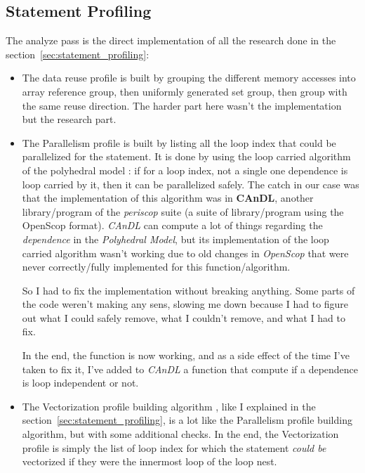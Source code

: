 \documentclass[paper=a4, fontsize=11.5pt]{scrartcl}
\numberwithin{equation}{section}        %
\numberwithin{figure}{section}          %
\numberwithin{table}{section}               %
\begin{document}
    \subsection{Statement Profiling}
    The analyze pass is the direct implementation of all the research done in the section~\ref{sec:statement_profiling}:
    \begin{itemize}
        \item The data reuse profile is built by grouping the
            different memory accesses into array reference group, then uniformly generated set group,
            then group with the same reuse direction. The harder part here wasn't the
            implementation but the research part.

        \item The Parallelism profile is built by listing all the loop index that could be
            parallelized for the statement. It is done by using the loop carried algorithm
            of the polyhedral model : if for a loop index, not a single one dependence is
            loop carried by it, then it can be parallelized safely.
            The catch in our case was that the implementation of this algorithm was in
            \textbf{CAnDL}, another library/program of the \textit{periscop} suite (a suite of
            library/program using the OpenScop format). \textit{CAnDL} can compute
            a lot of things regarding the \textit{dependence} in the \textit{Polyhedral Model},
            but its implementation of the loop carried algorithm wasn't working due to old
            changes in \textit{OpenScop} that were never correctly/fully implemented for this
            function/algorithm.
            
            So I had to fix the implementation without breaking anything.
            Some parts of the code weren't making any sens, slowing me down because I had
            to figure out what I could safely remove, what I couldn't remove, and what I
            had to fix.

            In the end, the function is now working, and as a side effect of the time I've taken
            to fix it, I've added to \textit{CAnDL} a function that compute if a dependence
            is loop independent or not.
        \item The Vectorization profile building algorithm
            , like I explained in the section~\ref{sec:statement_profiling}, is a lot like
            the Parallelism profile building algorithm, but with some additional checks.
            In the end, the Vectorization profile is simply the list of loop index for which
            the statement \textit{could be} vectorized if they were the innermost loop of the loop nest.\\


\end{itemize}
\end{document}
